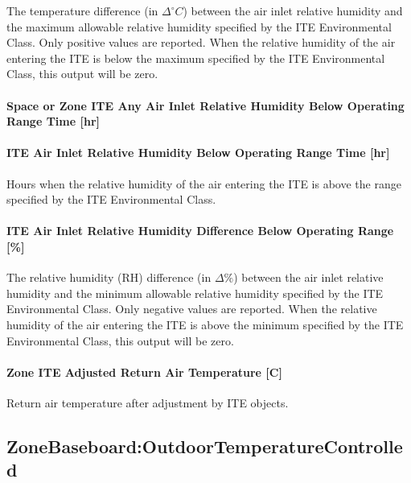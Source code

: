The temperature difference (in $\Delta^{\circ}C$) between the air inlet relative humidity and the maximum allowable relative humidity specified by the ITE Environmental Class. Only positive values are reported. When the relative humidity of the air entering the ITE is below the maximum specified by the ITE Environmental Class, this output will be zero.

\paragraph{Space or Zone ITE Any Air Inlet Relative Humidity Below Operating Range Time {[}hr{]}}\label{zone-ite-any-air-inlet-relative-humidity-below-operating-range-time-hr}

\paragraph{ITE Air Inlet Relative Humidity Below Operating Range Time {[}hr{]}}\label{ite-air-inlet-relative-humidity-below-operating-range-time-hr}

Hours when the relative humidity of the air entering the ITE is above the range specified by the ITE Environmental Class.

\paragraph{ITE Air Inlet Relative Humidity Difference Below Operating Range {[}\%{]}}\label{ite-air-inlet-relative-humidity-difference-below-operating-range}

The relative humidity (RH) difference (in $\Delta\%$) between the air inlet relative humidity and the minimum allowable relative humidity specified by the ITE Environmental Class. Only negative values are reported. When the relative humidity of the air entering the ITE is above the minimum specified by the ITE Environmental Class, this output will be zero.

\paragraph{Zone ITE Adjusted Return Air Temperature [C]}

Return air temperature after adjustment by ITE objects.

\subsection{ZoneBaseboard:OutdoorTemperatureControlled}\label{zonebaseboardoutdoortemperaturecontrolled}

